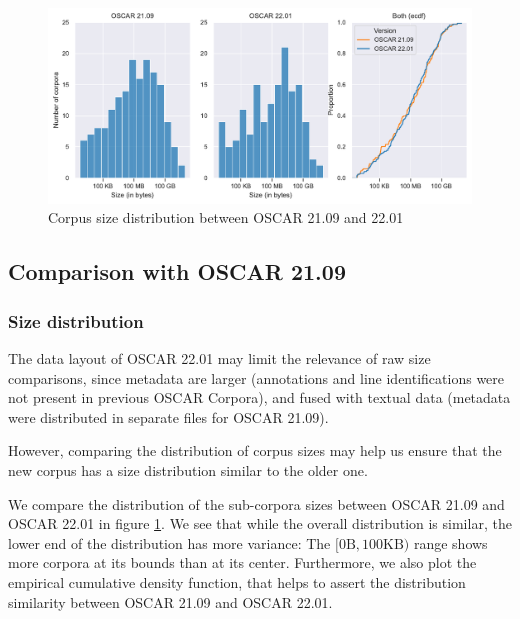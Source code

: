 \begin{figure}[!ht]
    \begin{center}
        \includegraphics[width=\linewidth]{static/media/oscar/towards/size-comp}
        \caption{Corpus size distribution between OSCAR 21.09 and 22.01}
        \label{fig.1}
    \end{center}
\end{figure}

\subsection{Comparison with OSCAR 21.09}
\subsubsection{Size distribution}

The data layout of OSCAR 22.01 may limit the relevance of raw size comparisons, since metadata are larger (annotations and line identifications were not present in previous OSCAR Corpora), and fused with textual data (metadata were distributed in separate files for OSCAR 21.09).

However, comparing the distribution of corpus sizes may help us ensure that the new corpus has a size distribution similar to the older one.

We compare the distribution of the sub-corpora sizes between OSCAR 21.09 and OSCAR 22.01 in figure \ref{fig.1}. We see that while the overall distribution is similar, the lower end of the distribution has more variance: The $[0\text{B}, 100\text{KB})$ range shows more corpora at its bounds than at its center. Furthermore, we also plot the empirical cumulative density function, that helps to assert the distribution similarity between OSCAR 21.09 and OSCAR 22.01.


